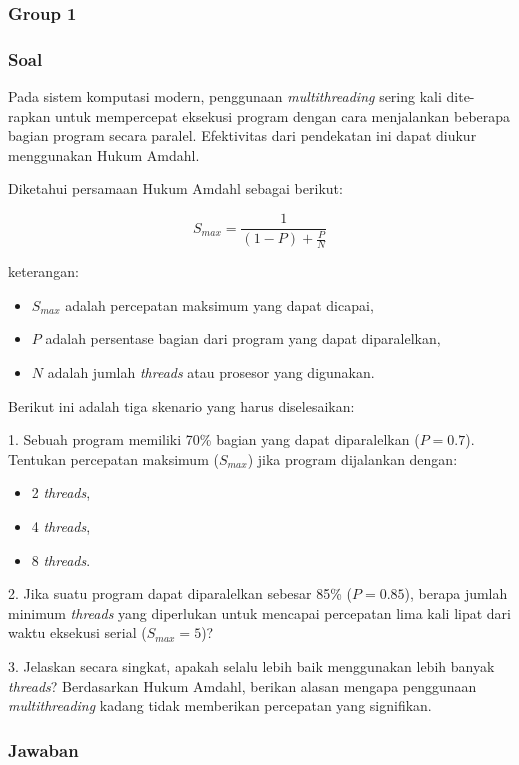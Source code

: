 \documentclass[12pt]{article}
\begin{document}
\subsubsection{Group 1}
\subsubsection*{Soal}

Pada sistem komputasi modern, penggunaan \textit{multithreading} sering kali dite-rapkan untuk mempercepat eksekusi program dengan cara menjalankan beberapa bagian program secara paralel. Efektivitas dari pendekatan ini dapat diukur menggunakan Hukum Amdahl. 

Diketahui persamaan Hukum Amdahl sebagai berikut:

\[
S_{max} = \frac{1}{(1 - P) + \frac{P}{N}}
\]

keterangan:
\begin{itemize}
    \item \(S_{max}\) adalah percepatan maksimum yang dapat dicapai,
    \item \(P\) adalah persentase bagian dari program yang dapat diparalelkan,
    \item \(N\) adalah jumlah \textit{threads} atau prosesor yang digunakan.
\end{itemize}

Berikut ini adalah tiga skenario yang harus diselesaikan:

1. Sebuah program memiliki 70\% bagian yang dapat diparalelkan (\(P = 0.7\)). Tentukan percepatan maksimum (\(S_{max}\)) jika program dijalankan dengan:
\begin{itemize}
    \item 2 \textit{threads},
    \item 4 \textit{threads},
    \item 8 \textit{threads}.
\end{itemize}

2. Jika suatu program dapat diparalelkan sebesar 85\% (\(P = 0.85\)), berapa jumlah minimum \textit{threads} yang diperlukan untuk mencapai percepatan lima kali lipat dari waktu eksekusi serial (\(S_{max} = 5\))?

3. Jelaskan secara singkat, apakah selalu lebih baik menggunakan lebih banyak \textit{threads}? Berdasarkan Hukum Amdahl, berikan alasan mengapa penggunaan \textit{multithreading} kadang tidak memberikan percepatan yang signifikan.

\subsubsection*{Jawaban}
\end{document}
